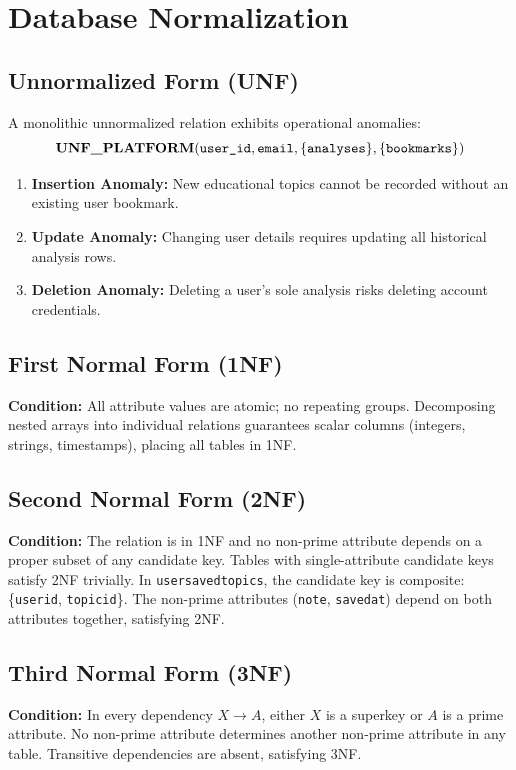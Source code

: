 \documentclass[12pt,a4paper]{report}
\DeclareRobustCommand{\_}{\textunderscore\allowbreak}
\begin{document}
\chapter{Database Normalization}

\section{Unnormalized Form (UNF)}
A monolithic unnormalized relation exhibits operational anomalies:
\[
\textbf{UNF\_PLATFORM} (\texttt{user\_id}, \texttt{email}, \{\texttt{analyses}\}, \{\texttt{bookmarks}\})
\]
\begin{enumerate}
    \item \textbf{Insertion Anomaly:} New educational topics cannot be recorded without an existing user bookmark.
    \item \textbf{Update Anomaly:} Changing user details requires updating all historical analysis rows.
    \item \textbf{Deletion Anomaly:} Deleting a user's sole analysis risks deleting account credentials.
\end{enumerate}

\section{First Normal Form (1NF)}
\textbf{Condition:} All attribute values are atomic; no repeating groups.
Decomposing nested arrays into individual relations guarantees scalar columns (integers, strings, timestamps), placing all tables in 1NF.

\section{Second Normal Form (2NF)}
\textbf{Condition:} The relation is in 1NF and no non-prime attribute depends on a proper subset of any candidate key.
Tables with single-attribute candidate keys satisfy 2NF trivially. In \texttt{user\_saved\_topics}, the candidate key is composite: \{\texttt{user\_id}, \texttt{topic\_id}\}. The non-prime attributes (\texttt{note}, \texttt{saved\_at}) depend on both attributes together, satisfying 2NF.

\section{Third Normal Form (3NF)}
\textbf{Condition:} In every dependency $X \rightarrow A$, either $X$ is a superkey or $A$ is a prime attribute.
No non-prime attribute determines another non-prime attribute in any table. Transitive dependencies are absent, satisfying 3NF.
\end{document}
